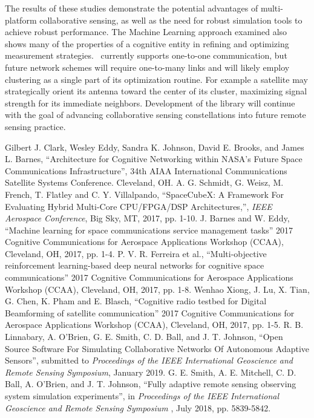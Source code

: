 \documentclass[conference]{IEEEtran}
\newcommand{\project}{{\sc{Collaborate}}~}
\begin{document}
\vfill
\break

The results of these studies demonstrate the potential advantages of multi-platform collaborative sensing, as well as the need for robust simulation tools to achieve robust performance. The Machine Learning approach examined also shows many of the properties
of a cognitive entity in refining and optimizing measurement strategies.
\project currently supports one-to-one communication, but future network schemes
will require one-to-many links and will likely employ clustering as a single
part of its optimization routine.  For example a satellite may strategically
orient its antenna toward the center of its cluster, maximizing signal strength
for its immediate neighbors. Development of the library will continue with the goal
of advancing collaborative sensing constellations into future remote sensing practice.


\small
\begin{thebibliography}{9}
 {
    Gilbert J. Clark, Wesley Eddy, Sandra K. Johnson, David E. Brooks, and
    James L. Barnes, ``Architecture for Cognitive Networking within NASA’s
    Future Space Communications Infrastructure'', 34th AIAA International
    Communications Satellite Systems Conference. Cleveland, OH.}
 {
    A. G. Schmidt, G. Weisz, M. French, T. Flatley and C. Y. Villalpando,
    ``SpaceCubeX: A Framework For Evaluating Hybrid Multi-Core CPU/FPGA/DSP
    Architectures,'', \textit{IEEE Aerospace Conference}, Big Sky, MT, 2017,
    pp. 1-10.}
 {
    J. Barnes and W. Eddy, ``Machine learning for space communications service
    management tasks'' 2017 Cognitive Communications for Aerospace Applications
    Workshop (CCAA), Cleveland, OH, 2017, pp. 1-4.
  }
 {
    P. V. R. Ferreira et al.,
    ``Multi-objective reinforcement learning-based deep neural networks for
    cognitive space communications''
    2017 Cognitive Communications for Aerospace Applications Workshop (CCAA),
    Cleveland, OH, 2017, pp. 1-8.
  }
 {
    Wenhao Xiong, J. Lu, X. Tian, G. Chen, K. Pham and E. Blasch, ``Cognitive
    radio testbed for Digital Beamforming of satellite communication'' 2017
    Cognitive Communications for Aerospace Applications Workshop (CCAA),
    Cleveland, OH, 2017, pp. 1-5.
}
 {
    R. B. Linnabary, A. O'Brien, G. E. Smith, C. D. Ball, and J. T. Johnson,
    ``Open Source Software For Simulating Collaborative Networks Of Autonomous
    Adaptive Sensors'', submitted to {\it Proceedings of the IEEE International
      Geoscience and Remote Sensing Symposium}, January 2019.}
 {
    G. E. Smith, A. E. Mitchell, C. D. Ball, A. O'Brien, and J. T. Johnson,
    ``Fully adaptive remote sensing observing system simulation experiments'',
    in {
      \it Proceedings of the IEEE International Geoscience and Remote Sensing
      Symposium} , July 2018, pp. 5839-5842.}
\end{thebibliography}
\end{document}
